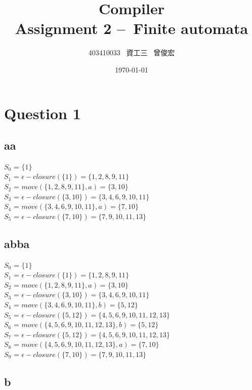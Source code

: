 \documentclass[12pt, A4]{article}
\title{Compiler \\ Assignment 2 –\ Finite automata}
\author{403410033 \ 資工三 \ 曾俊宏}
\date{\today}
\begin{document}
	
	\maketitle

	\section{Question 1}
	
	\subsection{aa}
	
	$S_0$ = $\{1\}$\\
	$S_1$ = $\epsilon-closure(\{1\}) = \{1, 2 , 8, 9, 11\}$\\
	$S_2$ = $move(\{1, 2, 8, 9, 11\}, a) = \{3, 10\}$\\
	$S_3$ = $\epsilon-closure(\{3, 10\}) = \{3, 4, 6, 9, 10, 11\}$\\
	$S_4$ = $move(\{3, 4, 6, 9, 10, 11\}, a) = \{7, 10\}$\\
	$S_5$ = $\epsilon-closure(\{7, 10\}) = \{7, 9, 10, 11, 13\}$\\
	
	\subsection{abba}
	
	$S_0$ = $\{1\}$\\
	$S_1$ = $\epsilon-closure(\{1\}) = \{1, 2 , 8, 9, 11\}$\\
	$S_2$ = $move(\{1, 2, 8, 9, 11\}, a) = \{3, 10\}$\\
	$S_3$ = $\epsilon-closure(\{3, 10\}) = \{3, 4, 6, 9, 10, 11\}$\\
	$S_4$ = $move(\{3, 4, 6, 9, 10, 11\}, b) = \{5, 12\}$\\
	$S_5$ = $\epsilon-closure(\{5, 12\}) = \{4, 5, 6, 9, 10, 11, 12, 13\}$\\
	$S_6$ = $move(\{4, 5, 6, 9, 10, 11, 12, 13\}, b) = \{5, 12\}$\\
	$S_7$ = $\epsilon-closure(\{5, 12\}) = \{4, 5, 6, 9, 10, 11, 12, 13\}$\\
	$S_8$ = $move(\{4, 5, 6, 9, 10, 11, 12, 13\}, a) = \{7, 10\}$\\
	$S_9$ = $\epsilon-closure(\{7, 10\}) = \{7, 9, 10, 11, 13\}$\\
	
	\subsection{b}
	
\end{document}
